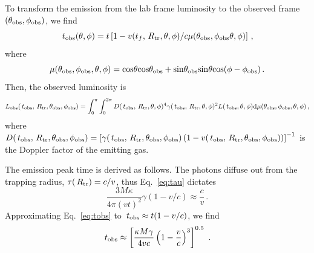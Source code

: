 \documentclass[twocolumn,dvipsnames]{aastex62}
\newcommand{\rtr}{\,{R_{\rm tr}}}
\newcommand{\tobs}{\,{t_{\rm obs}}}
\begin{document}
To transform the emission from the lab frame luminosity to the observed frame $(\theta_{\rm obs},\phi_{\rm obs})$, we find 
\begin{equation}\label{eq:tobs}
\tobs(\theta,\phi) = t\left[1-v(t_f,\rtr,\theta,\phi)/c\mu(\theta_{\rm obs},\phi_{\rm obs}\theta,\phi)\right]\,,
\end{equation}
where
\begin{equation}
    \mu(\theta_{\rm obs},\phi_{\rm obs},\theta,\phi) = {\rm cos}\theta{\rm cos}\theta_{\rm obs}+{\rm sin}\theta_{\rm obs}{\rm sin}\theta{\rm cos}({\phi-\phi_{\rm obs}})\,.
\end{equation}
Then, the observed luminosity is
\begin{equation}
    L_{\rm obs}(\tobs,\rtr,\theta_{\rm obs},\phi_{\rm obs}) = \int_0^\pi\int_0^{2\pi}D(\tobs,\rtr,\theta,\phi)^4\gamma(\tobs,\rtr,\theta,\phi)^2L(\tobs,\theta,\phi)\mathrm{d}\mu(\theta_{\rm obs},\phi_{\rm obs},\theta,\phi)\,,
\end{equation}
where $ D(\tobs,\rtr,\theta_{\rm obs},\phi_{\rm obs}) = \left[\gamma(\tobs,\rtr,\theta_{\rm obs},\phi_{\rm obs})\left(1-v(\tobs,\rtr,\theta_{\rm obs},\phi_{\rm obs})\right)\right]^{-1}$ is the Doppler factor of the emitting gas.

The emission peak time is derived as follows. The photons diffuse out from the trapping radius, $ \tau(\rtr) = c/v $, thus Eq.~\eqref{eq:tau} dictates
\begin{equation}
    \frac{3M\kappa}{4\pi(vt)^2}\gamma(1-v/c) \approx \frac{c}{v}\,.
\end{equation}
Approximating Eq.~\eqref{eq:tobs} to $ \tobs \approx t(1-v/c) $, we find
\begin{equation}\label{eq:tpeak}
    \tobs \approx \left[\frac{\kappa M \gamma}{4 v c}\left(1-\frac{v}{c}\right)^3\right]^{0.5}~.
\end{equation}
\end{document}

